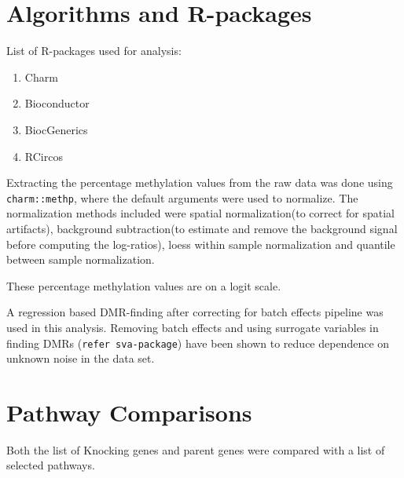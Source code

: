 \documentclass[11pt]{article}
\begin{document}
\section*{Algorithms and R-packages}

List of R-packages used for analysis:
\begin{enumerate}

\item Charm

\item Bioconductor

\item BiocGenerics

\item RCircos

\end{enumerate}

Extracting the percentage methylation values from the raw data was done using {\tt charm::methp}, where the default arguments were used to normalize. The normalization methods included were spatial normalization(to correct for spatial artifacts), background subtraction(to estimate and remove the background signal before computing the log-ratios), loess within sample normalization and quantile between sample normalization.

These percentage methylation values are on a logit scale.

A regression based DMR-finding after correcting for batch effects pipeline was used in this analysis. Removing batch effects and using surrogate variables in finding DMRs ({\tt refer sva-package}) have been shown to reduce dependence on unknown noise in the data set.



\section*{Pathway Comparisons}

Both the list of Knocking genes and parent genes were compared with a list of selected pathways.
\end{document}
